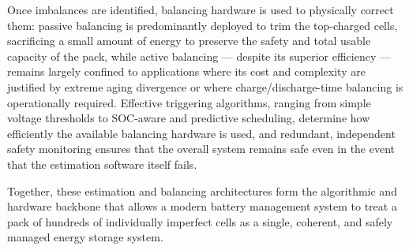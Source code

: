 Once imbalances are identified, balancing hardware is used to physically correct them: passive balancing is predominantly deployed to trim the top-charged cells, sacrificing a small amount of energy to preserve the safety and total usable capacity of the pack, while active balancing — despite its superior efficiency — remains largely confined to applications where its cost and complexity are justified by extreme aging divergence or where charge/discharge-time balancing is operationally required. Effective triggering algorithms, ranging from simple voltage thresholds to SOC-aware and predictive scheduling, determine how efficiently the available balancing hardware is used, and redundant, independent safety monitoring ensures that the overall system remains safe even in the event that the estimation software itself fails.

Together, these estimation and balancing architectures form the algorithmic and hardware backbone that allows a modern battery management system to treat a pack of hundreds of individually imperfect cells as a single, coherent, and safely managed energy storage system.



%
%
%
